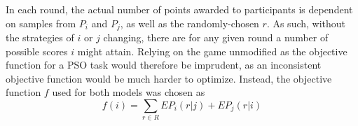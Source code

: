 \documentclass[11pt]{article}
\begin{document}
In each round, the actual number of points awarded to participants is dependent on samples from $P_i$ and $P_j$, as well as the randomly-chosen $r$. As such, without the strategies of $i$ or $j$ changing, there are for any given round a number of possible scores $i$ might attain. Relying on the game unmodified as the objective function for a PSO task would therefore be imprudent, as an inconsistent objective function would be much harder to optimize. Instead, the objective function $f$ used for both models was chosen as 
\begin{equation}
f(i) = \sum_{r \in R} EP_{i}(r|j) + EP_{j}(r|i)
\end{equation}

\end{document}
